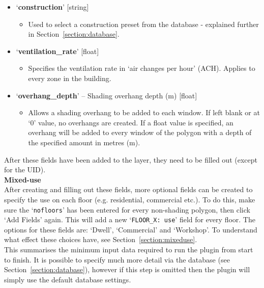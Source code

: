 \documentclass{article}
\begin{document}
\begin{itemize}
\begin{itemize}
    \end{itemize}
    \item `\textbf{construction}' [string]
    \begin{itemize}
        \item Used to select a construction preset from the database - explained further in Section~\ref{section:database}.
    \end{itemize}
    \item `\textbf{ventilation\_rate}' [float]
    \begin{itemize}
        \item Specifies the ventilation rate in `air changes per hour' (ACH). %
        Applies to every zone in the building.
    \end{itemize}
    \item `\textbf{overhang\_depth}' -- {Shading overhang depth (m)} [float]
    \begin{itemize}
        \item Allows a shading overhang to be added to each window. If left blank or at `0' value, no overhangs are created. If a float value is specified, an overhang will be added to every window of the polygon with a depth of the specified amount in metres (m).
    \end{itemize}
\end{itemize}
\vspace{5mm}
After these fields have been added to the layer, they need to be filled out (except for the UID). \\

\textbf{Mixed-use} \\
After creating and filling out these fields, more optional fields can be created to specify the use on each floor (e.g. residential, commercial etc.). To do this, make sure the `\texttt{nofloors}' has been entered for every non-shading polygon, then click `Add Fields' again. This will add a new  `\texttt{FLOOR\_X:~use}' field for every floor. The options for these fields are: `Dwell', `Commercial' and `Workshop'. To understand what effect these choices have, see Section~\ref{section:mixeduse}. \\

This summarises the minimum input data required to run the plugin from start to finish. It is possible to specify much more detail via the database (see Section~\ref{section:database}), however if this step is omitted then the plugin will simply use the default database settings.
\end{document}
